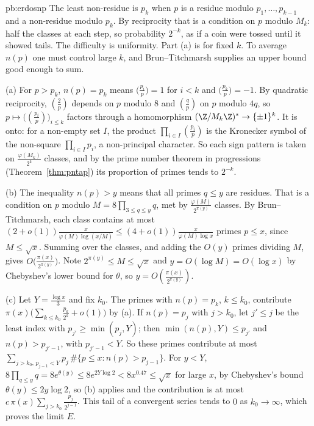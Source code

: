 \begin{solution}{pb:erdosnp}
\idea The least non-residue is $p_k$ when $p$ is a residue modulo $p_1,\dots,p_{k-1}$ and a non-residue modulo $p_k$. By reciprocity that is a condition on $p$ modulo $M_k$: half the classes at each step, so probability $2^{-k}$, as if a coin were tossed until it showed tails. The difficulty is uniformity. Part (a) is for fixed $k$. To average $n(p)$ one must control large $k$, and Brun--Titchmarsh supplies an upper bound good enough to sum.

\writeup (a) For $p>p_k$, $n(p)=p_k$ means $\bigl(\frac{p_i}p\bigr)=1$ for $i<k$ and $\bigl(\frac{p_k}p\bigr)=-1$. By quadratic reciprocity, $(\frac2p)$ depends on $p$ modulo $8$ and $(\frac qp)$
on $p$ modulo $4q$, so $p\mapsto\bigl((\frac{p_i}p)\bigr)_{i\le k}$ factors through a homomorphism $(\Z/M_k\Z)^*\to\{\pm1\}^k$. It is onto: for a non-empty set $I$, the product
$\prod_{i\in I}(\frac{p_i}p)$ is the Kronecker symbol of the non-square $\prod_{i\in I}p_i$, a non-principal character. So each sign pattern is taken on $\frac{\varphi(M_k)}{2^k}$ classes,
and by the prime number theorem in progressions (Theorem~\ref{thm:pntap}) its proportion of primes tends to $2^{-k}$.

(b) The inequality $n(p)>y$ means that all primes $q\le y$ are residues. That is a condition on $p$ modulo $M=8\prod_{3\le q\le y}q$, met by $\frac{\varphi(M)}{2^{\pi(y)}}$ classes. By Brun--Titchmarsh, each class
contains at most $(2+o(1))\frac x{\varphi(M)\log(x/M)}\le(4+o(1))\frac x{\varphi(M)\log x}$ primes $p\le x$, since $M\le\sqrt x$. Summing over the classes, and adding the $O(y)$ primes
dividing $M$, gives $O\bigl(\frac{\pi(x)}{2^{\pi(y)}}\bigr)$. Note $2^{\pi(y)}\le M\le\sqrt x$ and $y=O(\log M)=O(\log x)$ by Chebyshev's lower bound for $\theta$, so $y=O(\frac{\pi(x)}{2^{\pi(y)}})$.

(c) Let $Y=\frac{\log x}3$ and fix $k_0$. The primes with $n(p)=p_k$, $k\le k_0$, contribute $\pi(x)\bigl(\sum_{k\le k_0}\frac{p_k}{2^k}+o(1)\bigr)$ by (a). If $n(p)=p_j$ with $j>k_0$, let $j'\le j$
be the least index with $p_{j'}\ge\min(p_j,Y)$; then $\min(n(p),Y)\le p_{j'}$ and $n(p)>p_{j'-1}$, with $p_{j'-1}<Y$. So these primes contribute at most
$\sum_{j>k_0,\,p_{j-1}<Y}p_j\,\#\{p\le x:n(p)>p_{j-1}\}$. For $y<Y$, $8\prod_{q\le y}q=8e^{\theta(y)}\le8e^{2Y\log2}<8x^{0.47}\le\sqrt x$ for large $x$, by Chebyshev's bound $\theta(y)\le2y\log2$, so (b) applies and the contribution is at most
$c\,\pi(x)\sum_{j>k_0}\frac{p_j}{2^{j-1}}$. This tail of a convergent series tends to $0$ as $k_0\to\infty$, which proves the limit $E$.


\end{solution}
